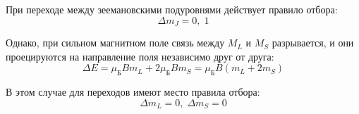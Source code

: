 \documentclass{article}
\begin{document}
	При переходе между зеемановскими подуровнями действует правило отбора:
	\begin{equation}
		\Delta m_J = 0,\;1
	\end{equation}

	Однако, при сильном магнитном поле связь между $M_L$ и $M_S$ разрывается, и они проецируются на направление поля независимо друг от друга:
	\begin{equation}
		\Delta E = \mu_\text{Б} B m_L + 2\mu_\text{Б} B m_S = \mu_\text{Б}B(m_L+2m_S)
	\end{equation}

	В этом случае для переходов имеют место правила отбора:
	\begin{equation}
		\Delta m_L=0,\;\Delta m_S = 0
	\end{equation}




	
\end{document}
